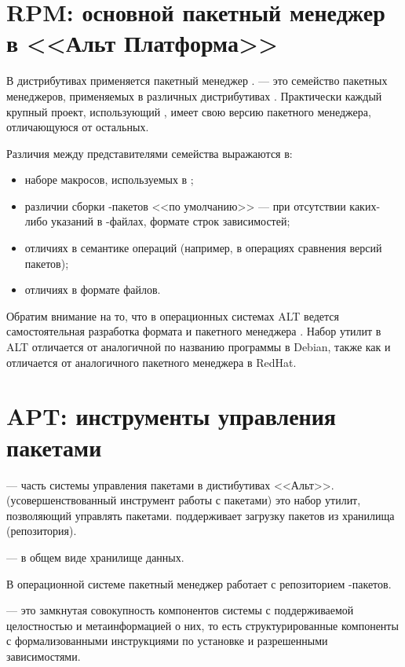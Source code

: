 \section{RPM: основной пакетный менеджер в <<Альт Платформа>>}
В дистрибутивах  применяется пакетный менеджер .  ---
это семейство пакетных менеджеров, применяемых в различных дистрибутивах .
Практически каждый крупный проект, использующий , имеет свою версию пакетного менеджера,
отличающуюся от остальных.

Различия между представителями семейства  выражаются в:

\begin{itemize}
	\item наборе макросов, используемых в ;
	\item различии сборки -пакетов <<по умолчанию>> --- при отсутствии каких-либо
	указаний в -файлах, формате строк зависимостей;
	\item отличиях в семантике операций (например, в операциях сравнения версий пакетов);
	\item отличиях в формате файлов.
\end{itemize}

Обратим внимание на то, что в операционных системах ALT ведется самостоятельная
разработка формата  и пакетного менеджера . Набор утилит  в ALT отличается
от аналогичной по названию программы в Debian, также как и  отличается от
аналогичного пакетного менеджера в RedHat.

\section{APT: инструменты управления пакетами}
 --- часть системы управления пакетами в дистибутивах <<Альт>>. 
(усовершенствованный инструмент работы с пакетами) это набор утилит, позволяющий управлять пакетами.
  поддерживает загрузку пакетов из хранилища (репозитория).

 ---  в общем виде хранилище данных.

В операционной системе  пакетный менеджер работает с репозиторием -пакетов.

 --- это замкнутая совокупность компонентов системы с
поддерживаемой целостностью и метаинформацией о них, то есть структурированные
компоненты с формализованными инструкциями по установке и разрешенными зависимостями.

